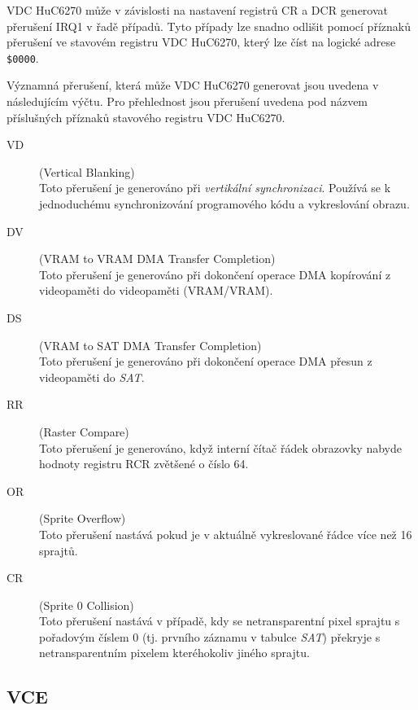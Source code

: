 VDC HuC6270 může v závislosti na nastavení registrů {\sf CR} a {\sf DCR}
generovat přerušení IRQ1 v řadě případů. Tyto případy lze snadno odlišit pomocí
příznaků přerušení ve stavovém registru VDC HuC6270, který lze číst na logické
adrese {\tt \$0000}.

Významná přerušení, která může VDC HuC6270 generovat jsou uvedena v
následujícím výčtu. Pro přehlednost jsou přerušení uvedena pod názvem
příslušných příznaků stavového registru VDC HuC6270.

\begin{description}
\item[VD] (Vertical Blanking) \\
	Toto přerušení je generováno při {\em vertikální synchronizaci}. Používá se k
	jednoduchému synchronizování programového kódu a vykreslování obrazu.

\item[DV] (VRAM to VRAM DMA Transfer Completion) \\
	Toto přerušení je generováno při dokončení operace DMA kopírování z
	videopaměti do videopaměti (VRAM/VRAM).

\item[DS] (VRAM to SAT DMA Transfer Completion) \\
	Toto přerušení je generováno při dokončení operace DMA přesun z videopaměti
	do {\it SAT}.

\item[RR] (Raster Compare) \\
	Toto přerušení je generováno, když interní čítač řádek obrazovky nabyde
	hodnoty registru {\sf RCR} zvětšené o číslo 64. \cite{Schleussinger98}

\item[OR] (Sprite Overflow) \\
	Toto přerušení nastává pokud je v aktuálně vykreslované řádce více než 16
	sprajtů.

\item[CR] (Sprite 0 Collision) \\
	Toto přerušení nastává v případě, kdy se netransparentní pixel sprajtu s
	pořadovým číslem 0 (tj. prvního záznamu v tabulce {\it SAT}) překryje s
	netransparentním pixelem kteréhokoliv jiného sprajtu.
\end{description}

%
%

\subsection{VCE}\label{chap:spec_hw_vce}

